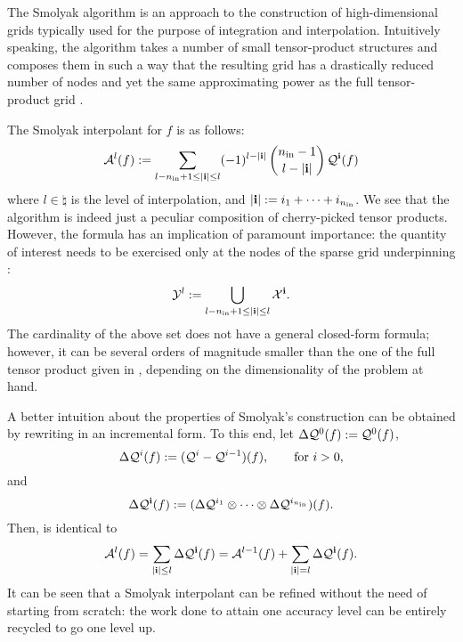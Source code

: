 The Smolyak algorithm is an approach to the construction of high-dimensional
grids typically used for the purpose of integration and interpolation.
Intuitively speaking, the algorithm takes a number of small tensor-product
structures and composes them in such a way that the resulting grid has a
drastically reduced number of nodes and yet the same approximating power as the
full tensor-product grid \cite{klimke2006}.

The Smolyak interpolant for $f$ is as follows:
\begin{equation} \elab{smolyak}
  \smolyak{l}(f) := \sum_{l - \nin + 1 \leq |\vi| \leq l} (-1)^{l - |\vi|} \, {\nin - 1 \choose l - |\vi|} \, \tensor{\vi}(f)
\end{equation}
where $l \in \natural$ is the level of interpolation, and $|\mathbf{i}| := i_1 + \dots
+ i_{n_\text{in}}$. We see that the algorithm is indeed just a peculiar composition of
cherry-picked tensor products. However, the formula has an implication of
paramount importance: the quantity of interest needs to be exercised only at the
nodes of the sparse grid underpinning :
\begin{equation} \elab{smolyak-grid}
  \Y^l := \bigcup_{l - \nin + 1 \leq |\vi| \leq l} \X^\vi.
\end{equation}
The cardinality of the above set does not have a general closed-form formula;
however, it can be several orders of magnitude smaller than the one of the full
tensor product given in , depending on the
dimensionality of the problem at hand.

A better intuition about the properties of Smolyak's construction can be
obtained by rewriting  in an incremental form. To this end, let
$\Delta \mathcal{Q}^{0}(f) := \mathcal{Q}^{0}(f)$,
\[
  \Delta \mathcal{Q}^{i}(f) := (\mathcal{Q}^{i} - \mathcal{Q}^{i - 1})(f), \qquad \text{for $i > 0$},
\]
and
\[
  \Delta \mathcal{Q}^{\mathbf{i}}(f) := (\Delta \mathcal{Q}^{i_1} \otimes \cdots \otimes \Delta \mathcal{Q}^{i_{n_\text{in}}})(f).
\]
Then,  is identical to
\begin{equation} \elab{smolyak-incremental}
  \smolyak{l}(f) = \sum_{|\vi| \leq l} \Delta \tensor{\vi}(f) = \smolyak{l - 1}(f) + \sum_{|\vi| = l} \Delta \tensor{\vi}(f).
\end{equation}
It can be seen that a Smolyak interpolant can be refined without the need of
starting from scratch: the work done to attain one accuracy level can be
entirely recycled to go one level up.

